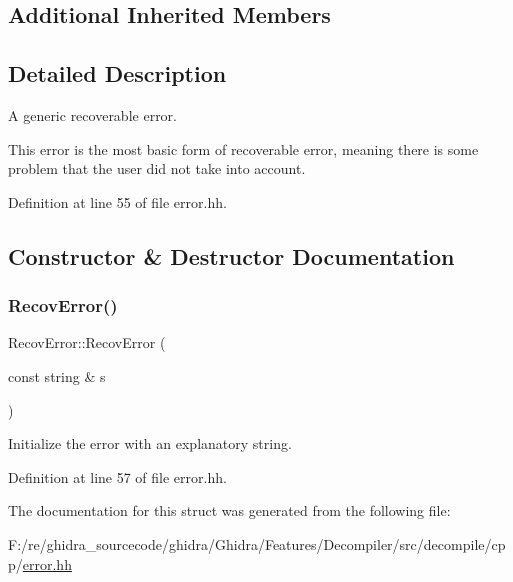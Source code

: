 \subsection*{Additional Inherited Members}


\subsection{Detailed Description}
A generic recoverable error. 

This error is the most basic form of recoverable error, meaning there is some problem that the user did not take into account. 

Definition at line 55 of file error.\+hh.



\subsection{Constructor \& Destructor Documentation}
\mbox{\label{struct_recov_error_aa08b4920f9a6aad56c83c813d9ac37f3}} 
\subsubsection{\texorpdfstring{RecovError()}{RecovError()}}
{\footnotesize\ttfamily Recov\+Error\+::\+Recov\+Error (\begin{DoxyParamCaption}\item[{const string \&}]{s }\end{DoxyParamCaption})\hspace{0.3cm}{\ttfamily [inline]}}



Initialize the error with an explanatory string. 



Definition at line 57 of file error.\+hh.



The documentation for this struct was generated from the following file\+:\begin{DoxyCompactItemize}
\item 
F\+:/re/ghidra\+\_\+sourcecode/ghidra/\+Ghidra/\+Features/\+Decompiler/src/decompile/cpp/\mbox{\hyperlink{error_8hh}{error.\+hh}}\end{DoxyCompactItemize}
